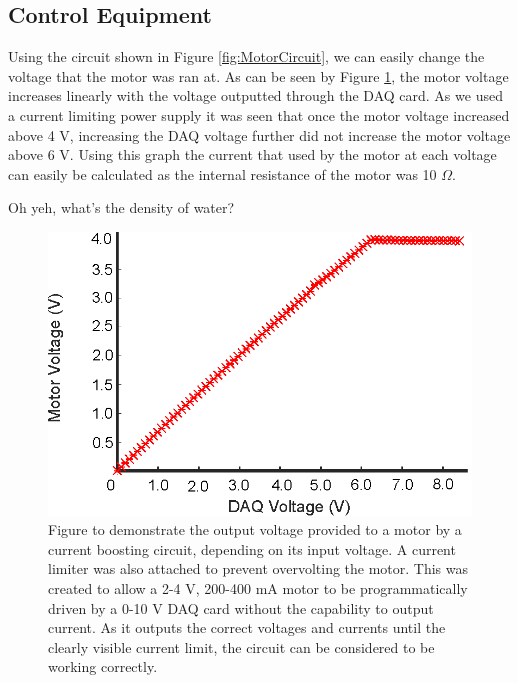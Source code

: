 \documentclass{physics_article_B}
\begin{document}
    \subsection{Control Equipment}
    
        Using the circuit shown in Figure \ref{fig:MotorCircuit}, we can easily change the voltage that the motor was ran at. As can be seen by Figure \ref{fig:MotorCalib}, the motor voltage increases linearly with the voltage outputted through the DAQ card. As we used a current limiting power supply it was seen that once the motor voltage increased above 4 V, increasing the DAQ voltage further did not increase the motor voltage above 6 V. Using this graph the current that used by the motor at each voltage can easily be calculated as the internal resistance of the motor was 10 $\Omega$.
        
        Oh yeh, what's the density of water?
        
        \begin{figure}[H]
            \centering
            \hspace*{-1cm}\includegraphics{Figures/MotorCalib.eps}
            \caption{Figure to demonstrate the output voltage provided to a motor by a current boosting circuit, depending on its input voltage. A current limiter was also attached to prevent overvolting the motor. This was created to allow a 2-4 V, 200-400 mA motor to be programmatically driven by a 0-10 V DAQ card without the capability to output current. As it outputs the correct voltages and currents until the clearly visible current limit, the circuit can be considered to be working correctly.}\label{fig:MotorCalib}
        \end{figure}
        
\end{document}
